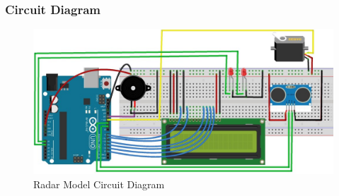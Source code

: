 \documentclass[a4paper]{report}
\begin{document}
                \subsubsection{\large{Circuit Diagram}}
                    \begin{figure}[H]
                        \centering
                        \includegraphics[width=\linewidth]{circuit.jpg}
                        \caption{\label{fig:pic}Radar Model Circuit Diagram}
                    \end{figure}
\end{document}
